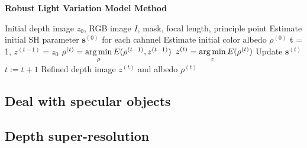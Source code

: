 \begin{algorithm}[!htbp]
	\begin{algorithmic}[1] 
  		\caption{\textbf{Robust Light Variation Model Method}}
		\label{alg:robust}
		 \renewcommand{\algorithmicrequire}{\textbf{Input:}}
		 \renewcommand{\algorithmicensure}{\textbf{Output:}}
		 \REQUIRE Initial depth image $z_0$, RGB image $I$, mask, focal length, principle point
		 \vspace{1.8mm}
		 \STATE Estimate initial SH parameter $\mathbf{s}^{(0)}$ for each cahnnel 
		 \STATE Estimate initial color albedo $\rho^{(0)}$  
		 \STATE t = 1, $z^{(t-1)} = z_0$
		 \vspace{1.8mm}
		   \vspace{1.8mm}
			\STATE $\rho^{(t)} = \operatorname*{arg\,min} \limits_{\rho} E(\rho^{(t-1)}, z^{(t-1)})$ 
			  \STATE $z^{(t)} = \operatorname*{arg\,min} \limits_{z} E(\rho^{(t)})$ 
			  \STATE Update $\mathbf{s}^{(t)}$ 
			  \vspace{1.8mm}
		          \STATE $t := t + 1$
		 \vspace{1.8mm}
		  \ENDWHILE
		  \ENSURE  Refined depth image $z^{(t)}$ and albedo $\rho^{(t)}$
	\end{algorithmic}
\end{algorithm}

\subsection{Deal with specular objects}


\subsection{Depth super-resolution}



